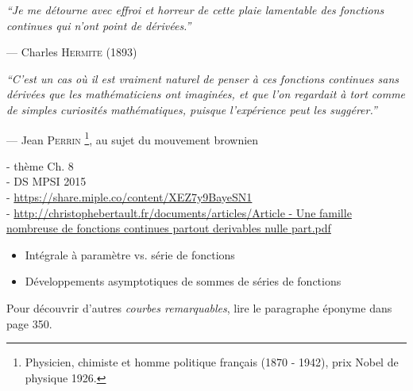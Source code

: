 \epigraph{\emph{``Je me détourne avec effroi et horreur de cette plaie lamentable des fonctions continues qui n'ont point de dérivées.''}}{--- Charles \textsc{Hermite} (1893)}
    
\epigraph{\emph{``C’est un cas où il est vraiment naturel de penser à ces fonctions continues sans dérivées que les mathématiciens ont imaginées, et que l’on regardait à tort comme de simples curiosités mathématiques, puisque l’expérience peut les suggérer.''}}{--- Jean \textsc{Perrin} \footnote{Physicien, chimiste et homme politique français (1870 - 1942), prix Nobel de physique 1926.}, au sujet du mouvement brownien}
    
- thème Ch. 8 \\
- DS MPSI 2015 \\
- \url{https://share.miple.co/content/XEZ7y9BayeSN1} \\
- \url{http://christophebertault.fr/documents/articles/Article - Une famille nombreuse de fonctions continues partout derivables nulle part.pdf}

\begin{itemize}
    \item Intégrale à paramètre vs. série de fonctions
    \item Développements asymptotiques de sommes de séries de fonctions
\end{itemize}


Pour découvrir d'autres \emph{courbes remarquables}, lire le paragraphe éponyme dans \cite{contre-exemples} page 350. 